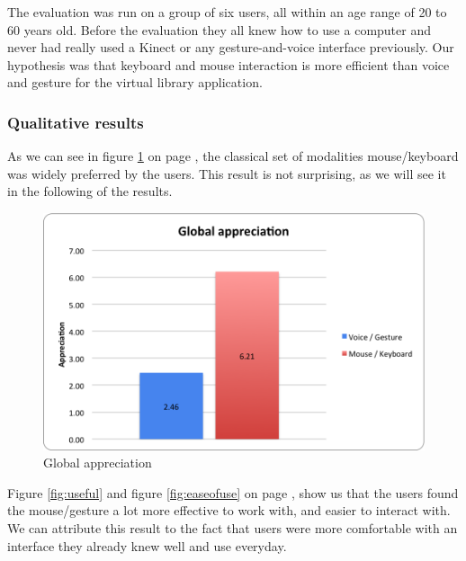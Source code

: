 \documentclass[a4paper, 10pt]{article}
\begin{document}
	\par{The evaluation was run on a group of six users, all within an age range of 20 to 60 years old. Before the evaluation they all knew how to use a computer and never had really used a Kinect or any gesture-and-voice interface previously. Our hypothesis was that keyboard and mouse interaction is more efficient than voice and gesture for the virtual library application.}
	
	\subsubsection{Qualitative results}
	
	\par{As we can see in figure \ref{fig:appreciation} on page \pageref{fig:appreciation}, the classical set of modalities mouse/keyboard was widely preferred by the users. This result is not surprising, as we will see it in the following of the results.}
	
	\begin{figure}[h]
		\centering
			\includegraphics[scale=0.6]{graphs/globa_appreciation.png}
		\caption{Global appreciation}
		\label{fig:appreciation}
	\end{figure}
	
	\par{Figure \ref{fig:useful} and figure \ref{fig:easeofuse} on page \pageref{fig:useful}, show us that the users found the mouse/gesture a lot more effective to work with, and easier to interact with. We can attribute this result to the fact that users were more comfortable with an interface they already knew well and use everyday.}
	
\end{document}
